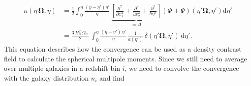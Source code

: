 \documentclass[oneside]{book}
\newcommand*{\rd}{\mathrm{d}}
\begin{document}
\begin{align}
\kappa(\eta\,\boldsymbol{\Omega},\eta) &= \frac{1}{2} \int_0^\eta \frac{(\eta-\eta')\eta'}{\eta}\, \underbrace{\left[\frac{\partial^2}{\partial x_1^2}+\frac{\partial^2}{\partial x_2^2}+\frac{\partial^2}{\partial \eta^2}\right]}_{=\Delta}(\Phi+\Psi)(\eta'\boldsymbol{\Omega},\eta') \rd \eta'  \nonumber \\
&= \frac{3\,H_0^2\,\Omega_m}{2}\,\int_0^\eta \frac{(\eta-\eta')\,\eta'}{\eta}\,\frac{1}{a(\eta')}\,\delta(\eta'\boldsymbol{\Omega},\eta') \,\rd\eta'.
\end{align}
This equation describes how the convergence can be used as a density contrast field to calculate the spherical multipole moments. Since we still need to average over multiple galaxies in a redshift bin $i$, we need to convolve the convergence with the galaxy distribution $n_i$ and find 
\end{document}
